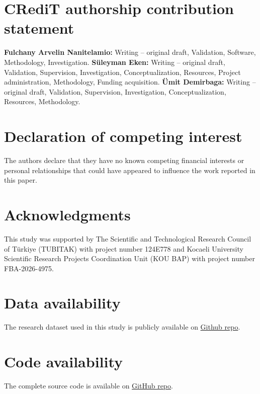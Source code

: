 \documentclass[5p, times]{elsarticle}
\begin{document}

\section*{CRediT authorship contribution statement}
\textbf{Fulchany Arvelin Nanitelamio:} Writing – original draft, Validation, Software, Methodology, Investigation. \textbf{Süleyman Eken:} Writing – original draft, Validation, Supervision, Investigation, Conceptualization, Resources, Project administration, Methodology, Funding acquisition. \textbf{Ümit Demirbaga:} Writing – original draft, Validation, Supervision, Investigation, Conceptualization, Resources, Methodology.

\section*{Declaration of competing interest}
The authors declare that they have no known competing financial interests or personal relationships that could have appeared to influence the work reported in this paper.

\section*{Acknowledgments}
This study was supported by The Scientific and Technological Research Council of Türkiye (TUBITAK) with project number 124E778 and Kocaeli University Scientific Research Projects Coordination Unit (KOU BAP) with project number FBA-2026-4975.

\section*{Data availability}
The research dataset used in this study is publicly available on \href{https://www.kaggle.com/datasets/cnbrkdmn/phpa-research-datasets}{Github repo}.

\section*{Code availability}
The complete source code is available on \href{https://github.com/syswe/llm-phpa}{GitHub repo}.

%
\end{document}
